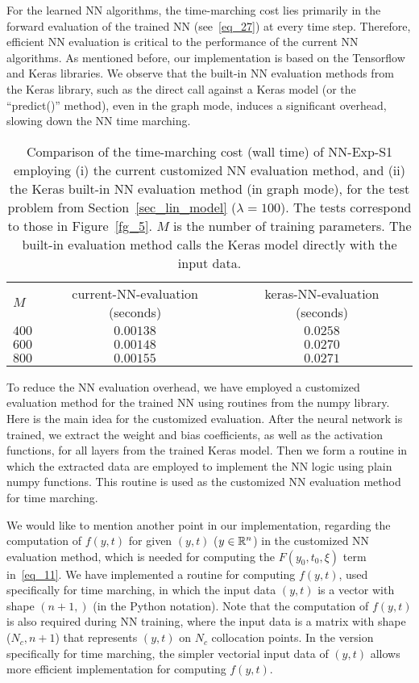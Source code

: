 For the learned NN algorithms, the time-marching cost lies primarily in
the forward evaluation of the trained NN (see~\eqref{eq_27})
at every time step. Therefore, efficient NN evaluation
is critical to the performance of the current NN algorithms.
As mentioned before, our implementation 
is based on the Tensorflow and Keras libraries.
We observe that the built-in NN evaluation methods from the Keras library, such as
the direct call against a Keras model (or the ``predict()'' method),
even in the graph mode,
induces a significant overhead, slowing down the NN time marching.

\begin{table}[tb]
  \centering
  \begin{tabular}{lcc}
    \hline
    $M$ & current-NN-evaluation (seconds) & keras-NN-evaluation (seconds) \\
    $400$ & $0.00138$ & $0.0258$ \\
    $600$ & $0.00148$ & $0.0270$ \\
    $800$ & $0.00155$ & $0.0271$ \\
    \hline
  \end{tabular}
  \caption{Comparison of the time-marching cost (wall time) of
    NN-Exp-S1 employing (i) the current customized NN evaluation method, and
    (ii) the Keras built-in NN evaluation method (in graph mode),
    for the test problem from Section~\ref{sec_lin_model} ($\lambda=100$).
    The tests correspond to those in Figure~\ref{fg_5}.
    $M$ is the number of training parameters.
    The built-in evaluation method calls the Keras model 
    directly with the input data.
  }
  \label{tab_1}
\end{table}


To reduce the NN evaluation overhead, we have employed a customized
evaluation method for the trained NN  using routines from
the numpy library. Here is the main idea for the customized evaluation.
After the neural network is trained,
we extract the weight and bias coefficients, as well as the activation functions,
for all layers from the trained Keras model. Then we form a routine in which
the extracted data are employed to implement the NN logic using
plain numpy functions. This routine is used as the customized NN evaluation
method for time marching.


%
We would like to mention
another point in our implementation, regarding the computation of $f(y,t)$
for given $(y,t)$ ($y\in\mathbb{R}^n$) in the customized NN evaluation method, which is needed
for computing the $F(y_0,t_0,\xi)$ term in~\eqref{eq_11}.
We have implemented a routine for computing $f(y,t)$, used
specifically for time marching, in which the input data $(y,t)$ is
a vector with shape $(n+1,)$ (in the Python notation). Note that the computation of
$f(y,t)$ is also required during NN training, where the input data is a matrix
with shape ($N_c,n+1$) that represents $(y,t)$ on $N_c$ collocation points.
In the version specifically for time marching,
the simpler vectorial input data of $(y,t)$ allows
more efficient implementation for computing $f(y,t)$.

